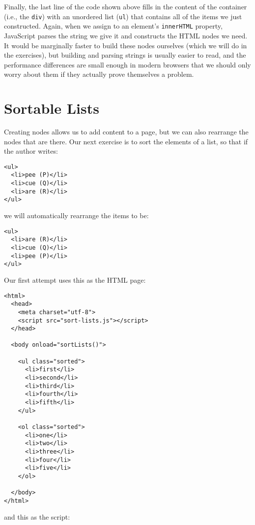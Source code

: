 Finally,
the last line of the code shown above
fills in the content of the container (i.e., the \texttt{div})
with an unordered list (\texttt{ul})
that contains all of the items we just constructed.
Again,
when we assign to an element's \texttt{innerHTML} property,
JavaScript parses the string we give it
and constructs the HTML nodes we need.
It would be marginally faster to build these nodes ourselves
(which we will do in the exercises),
but building and parsing strings is usually easier to read,
and the performance differences are small enough in modern browsers
that we should only worry about them if they actually prove themselves a problem.

\section{Sortable Lists}\label{s:pages-sort-list}

Creating nodes allows us to add content to a page,
but we can also rearrange the nodes that are there.
Our next exercise is to sort the elements of a list,
so that if the author writes:

\begin{verbatim}
<ul>
  <li>pee (P)</li>
  <li>cue (Q)</li>
  <li>are (R)</li>
</ul>
\end{verbatim}

\noindent
we will automatically rearrange the items to be:

\begin{verbatim}
<ul>
  <li>are (R)</li>
  <li>cue (Q)</li>
  <li>pee (P)</li>
</ul>
\end{verbatim}

Our first attempt uses this as the HTML page:

\begin{verbatim}
<html>
  <head>
    <meta charset="utf-8">
    <script src="sort-lists.js"></script>
  </head>

  <body onload="sortLists()">

    <ul class="sorted">
      <li>first</li>
      <li>second</li>
      <li>third</li>
      <li>fourth</li>
      <li>fifth</li>
    </ul>

    <ol class="sorted">
      <li>one</li>
      <li>two</li>
      <li>three</li>
      <li>four</li>
      <li>five</li>
    </ol>

  </body>
</html>
\end{verbatim}

\noindent
and this as the script:

